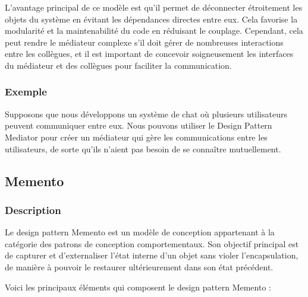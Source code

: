 \documentclass[french]{article}
\begin{document}
L'avantage principal de ce modèle est qu'il permet de déconnecter étroitement les objets du système en évitant les dépendances directes entre eux. Cela favorise la modularité et la maintenabilité du code en réduisant le couplage. Cependant, cela peut rendre le médiateur complexe s'il doit gérer de nombreuses interactions entre les collègues, et il est important de concevoir soigneusement les interfaces du médiateur et des collègues pour faciliter la communication.


\subsubsection{Exemple}

Supposons que nous développons un système de chat où plusieurs utilisateurs peuvent communiquer entre eux. Nous pouvons utiliser le Design Pattern Mediator pour créer un médiateur qui gère les communications entre les utilisateurs, de sorte qu'ils n'aient pas besoin de se connaître mutuellement.




\newpage

\subsection{Memento}

\subsubsection{Description}

Le design pattern Memento est un modèle de conception appartenant à la catégorie des patrons de conception comportementaux. Son objectif principal est de capturer et d'externaliser l'état interne d'un objet sans violer l'encapsulation, de manière à pouvoir le restaurer ultérieurement dans son état précédent.

Voici les principaux éléments qui composent le design pattern Memento :
\end{document}
